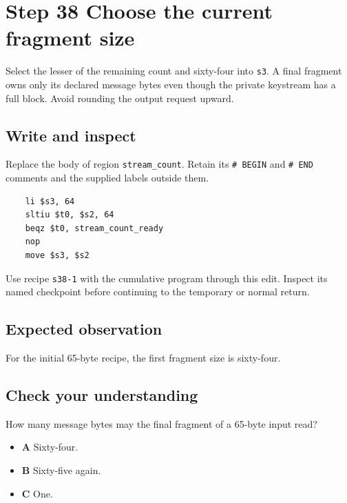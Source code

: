 \section{Step 38 Choose the current fragment size}\label{chacha-s38}

Select the lesser of the remaining count and sixty-four into \texttt{s3}. A final fragment owns only its declared message bytes even though the private keystream has a full block. Avoid rounding the output request upward.

\subsection{Write and inspect}
Replace the body of region \texttt{stream\_count}. Retain its \texttt{\# BEGIN} and \texttt{\# END} comments and the supplied labels outside them.

\begin{verbatim}
    li $s3, 64
    sltiu $t0, $s2, 64
    beqz $t0, stream_count_ready
    nop
    move $s3, $s2
\end{verbatim}

Use recipe \texttt{s38-1} with the cumulative program through this edit. Inspect its named checkpoint before continuing to the temporary or normal return.

\subsection{Expected observation}
For the initial 65-byte recipe, the first fragment size is sixty-four.

\subsection{Check your understanding}
How many message bytes may the final fragment of a 65-byte input read?

\begin{itemize}
  \item \textbf{A} Sixty-four.
  \item \textbf{B} Sixty-five again.
  \item \textbf{C} One.
\end{itemize}

